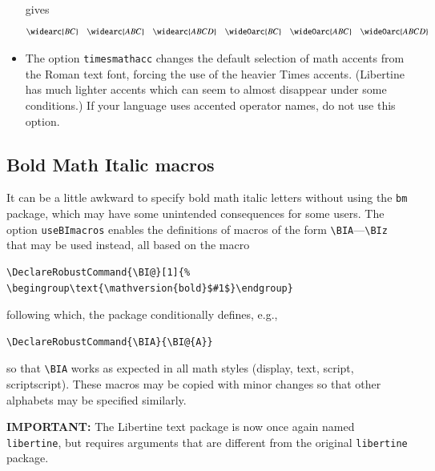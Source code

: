 \documentclass[11pt]{article}
\theoremstyle{oldplain}
\theoremstyle{plain}
\begin{document}
\begin{itemize}
gives
\[\widearc{BC}\quad\widearc{ABC}\quad\widearc{ABCD}\quad
\wideOarc{BC}\quad\wideOarc{ABC}\quad\wideOarc{ABCD}\]
\item The option {\tt timesmathacc} changes the default selection of math accents from the Roman text font, forcing the use of the heavier Times accents. (Libertine has much lighter accents which can seem to almost disappear under some conditions.) If your language uses accented operator names, do not use this option.
\end{itemize}
\bigskip

\subsection{Bold Math Italic macros}
It can be a little awkward to specify bold math italic letters without using the \texttt{bm} package, which may have some unintended consequences for some users. The option \texttt{useBImacros} enables the definitions of macros of the form \verb|\BIA|---\verb|\BIz| that may be used instead, all based on the macro 
\begin{verbatim}
\DeclareRobustCommand{\BI@}[1]{%
\begingroup\text{\mathversion{bold}$#1$}\endgroup}
\end{verbatim}
following which, the package conditionally defines, e.g.,
\begin{verbatim}
\DeclareRobustCommand{\BIA}{\BI@{A}}
\end{verbatim}
so that \verb|\BIA| works as expected in all math styles (display, text, script, scriptscript). These macros may be copied with minor changes so that other alphabets may be specified similarly.

\textbf{IMPORTANT:} The Libertine text package is now once again named {\tt libertine}, but requires arguments that are different from the original {\tt libertine} package.
\end{document}

